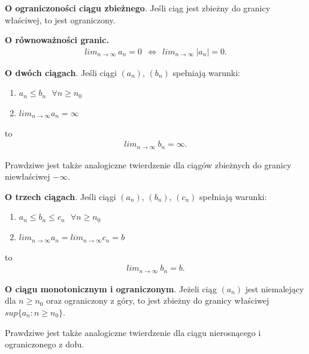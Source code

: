 \documentclass[12pt]{article}
\begin{document}
    \begin{theorem}
        \textbf{O ograniczoności ciągu zbieżnego}. Jeśli ciąg jest zbieżny do granicy właściwej, to jest ograniczony.
    \end{theorem}

    \begin{theorem}
        \textbf{O równoważności granic.}
        \begin{align*}
            lim_{n \rightarrow \infty} ~ a_n = 0 ~~ \Leftrightarrow ~~ lim_{n \rightarrow \infty} ~ |a_n| = 0.
        \end{align*}
    \end{theorem}

    \begin{theorem}
        \textbf{O dwóch ciągach}. Jeśli ciągi $(a_n)$, $(b_n)$ spełniają warunki:
        \begin{enumerate}
            \item $a_n \leq b_n ~~~ \forall n \geq n_0$
            \item $lim_{n \rightarrow \infty} a_n = \infty$
        \end{enumerate}
        to
        \begin{align*}
            lim_{n \rightarrow \infty} ~ b_n = \infty.
        \end{align*}

        Prawdziwe jest także analogiczne twierdzenie dla ciągów zbieżnych do granicy niewłaściwej $-\infty$.
    \end{theorem}

    \begin{theorem}
        \textbf{O trzech ciągach}. Jeśli ciągi $(a_n)$, $(b_n)$, $(c_n)$ spełniają warunki:
        \begin{enumerate}
            \item $a_n \leq b_n \leq c_n ~~~ \forall n \geq n_0$
            \item $lim_{n  \rightarrow \infty} a_n = lim_{n \rightarrow \infty} c_n = b$
        \end{enumerate}
        to
        \begin{align*}
            lim_{n \rightarrow \infty} ~ b_n = b.
        \end{align*}
    \end{theorem}

    \begin{theorem}
        \textbf{O ciągu monotonicznym i ograniczonym}. Jeżeli ciąg $(a_n)$ jest niemalejący dla $n \geq n_0$ oraz
        ograniczony z góry, to jest zbieżny do granicy właściwej $sup\{a_n : n \geq n_0\}$.

        Prawdziwe jest także analogiczne twierdzenie dla ciągu nierosnącego i ograniczonego z dołu.
    \end{theorem}
\end{document}
